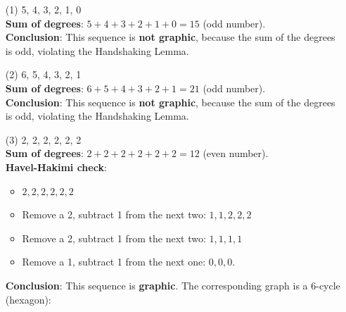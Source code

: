\documentclass[12pt]{article}
\begin{document}
\begin{itemize}
\begin{itemize}
    \item[(1)] {5, 4, 3, 2, 1, 0} \\
    \textbf{Sum of degrees}: \( 5 + 4 + 3 + 2 + 1 + 0 = 15 \) (odd number). \\
    \textbf{Conclusion}: This sequence is \textbf{not graphic}, because the sum of the degrees is odd, violating the Handshaking Lemma.
    \item[(2)] {6, 5, 4, 3, 2, 1} \\
    \textbf{Sum of degrees}: \( 6 + 5 + 4 + 3 + 2 + 1 = 21 \) (odd number). \\
    \textbf{Conclusion}: This sequence is \textbf{not graphic}, because the sum of the degrees is odd, violating the Handshaking Lemma.
    \item[(3)] {2, 2, 2, 2, 2, 2} \\
    \textbf{Sum of degrees}: \( 2 + 2 + 2 + 2 + 2 + 2 = 12 \) (even number). \\
    \textbf{Havel-Hakimi check}:
    \begin{itemize}
        \item \( 2, 2, 2, 2, 2, 2 \)
        \item Remove a 2, subtract 1 from the next two: \( 1, 1, 2, 2, 2 \)
        \item Remove a 2, subtract 1 from the next two: \( 1, 1, 1, 1 \)
        \item Remove a 1, subtract 1 from the next one: \( 0, 0, 0 \).
    \end{itemize}
    \textbf{Conclusion}: This sequence is \textbf{graphic}. The corresponding graph is a 6-cycle (hexagon): \\
\end{itemize}
\end{itemize}
\end{document}
